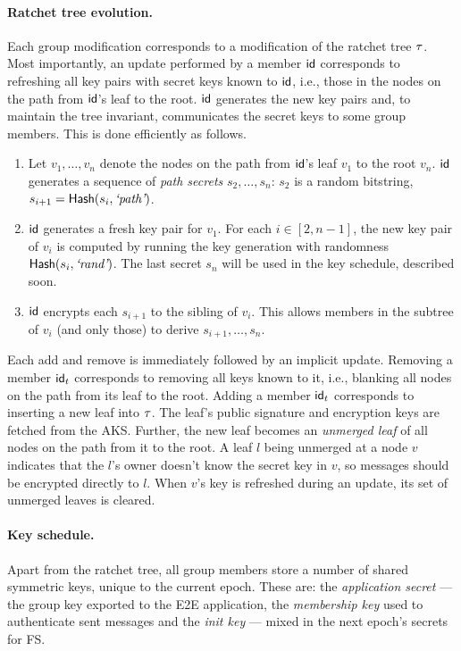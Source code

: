 \paragraph{Ratchet tree evolution.}
Each group modification corresponds to a modification of the ratchet tree $\tau$. Most importantly, an update performed by a member ${\mathsf{id}}$ corresponds to refreshing all key pairs with secret keys known to ${\mathsf{id}}$, i.e., those in the nodes on the path from ${\mathsf{id}}$'s leaf to the root. ${\mathsf{id}}$ generates the new key pairs and, to maintain the tree invariant, communicates the secret keys to some group members. This is done efficiently as follows.
\begin{enumerate}[itemsep=1pt,topsep=1pt,parsep=1pt]
  \item Let $v_1, \dots, v_n$ denote the nodes on the path from ${\mathsf{id}}$'s leaf $v_1$ to the root $v_n$.
  ${\mathsf{id}}$ generates a sequence of \emph{path secrets} $s_2, \dots, s_n$: $s_2$ is a random bitstring, $s_{i+1} = {\mathsf{Hash}}(s_i,{\text{\normalfont \it`path'}})$.
  \item ${\mathsf{id}}$ generates a fresh key pair for $v_1$. For each $i\in[2,n-1]$, the new key pair of $v_i$ is computed by
    running the key generation with randomness ${\mathsf{Hash}}(s_i,{\text{\normalfont \it`rand'}})$. The last secret $s_n$ will be used in the key schedule, described soon.
  \item ${\mathsf{id}}$ encrypts each $s_{i+1}$ to the sibling of $v_i$. This allows members in the subtree of $v_i$ (and only those) to derive $s_{i+1}, \dots, s_n$.
\end{enumerate}

Each add and remove is immediately followed by an implicit update.
Removing a member ${\mathsf{id}}_t$ corresponds to removing all keys known to it, i.e., blanking all nodes on the path from its leaf to the root.
%
Adding a member ${\mathsf{id}}_t$ corresponds to inserting a new leaf into $\tau$. The leaf's public signature and encryption keys are fetched from the AKS. Further, the new leaf becomes an \emph{unmerged leaf} of all nodes on the path from it to the root. A leaf $l$ being unmerged at a node $v$ indicates that the $l$'s owner doesn't know the secret key in $v$, so messages should be encrypted directly to $l$. When $v$'s key is refreshed during an update, its set of unmerged leaves is cleared.

\paragraph{Key schedule.}
Apart from the ratchet tree, all group members store a number of shared symmetric keys, unique to the current epoch. These are: the \emph{application secret} --- the group key exported to the E2E application, the \emph{membership key} used to authenticate sent messages and the \emph{init key} --- mixed in the next epoch's secrets for FS.


